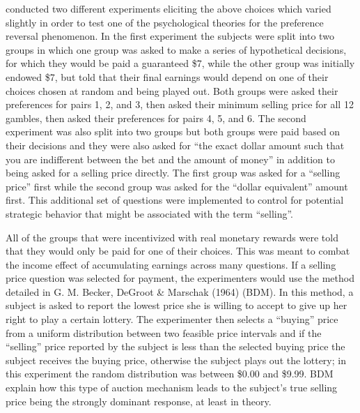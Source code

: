 \documentclass[../main.tex]{subfiles}
\begin{document}
\textcite{Grether1979} conducted two different experiments eliciting the above choices which  varied slightly in order to test one of the psychological theories for the preference reversal phenomenon.
In the first experiment the subjects were split into two groups in which one group was asked to make a series of hypothetical decisions, for which they would be paid a guaranteed \$7, while the other group was initially endowed \$7, but told that their final earnings would depend on one of their choices chosen at random and being played out.
Both groups were asked their preferences for pairs 1, 2, and 3, then asked their minimum selling price for all 12 gambles, then asked their preferences for pairs 4, 5, and 6.
The second experiment was also split into two groups but both groups were paid based on their decisions and they were also asked for \enquote{the exact dollar amount such that you are indifferent between the bet and the amount of money} in addition to being asked for a selling price directly.
The first group was asked for a \enquote{selling price} first while the second group was asked for the \enquote{dollar equivalent} amount first.
This additional set of questions were implemented to control for potential strategic behavior that might be associated with the term \enquote{selling}.

All of the groups that were incentivized with real monetary rewards were told that they would only be paid for one of their choices.
This was meant to combat the income effect of accumulating earnings across many questions.
If a selling price question was selected for payment, the experimenters would use the method detailed in G. M. Becker, DeGroot \& Marschak (1964) (BDM).
In this method, a subject is asked to report the lowest price she is willing to accept to give up her right to play a certain lottery.
The experimenter then selects a \enquote{buying} price from a uniform distribution between two feasible price intervals and if the \enquote{selling} price reported by the subject is less than the selected buying price the subject receives the buying price, otherwise the subject plays out the lottery; in this experiment the random distribution was between \$0.00 and \$9.99.
BDM explain how this type of auction mechanism leads to the subject's true selling price being the strongly dominant response, at least in theory.
\end{document}
